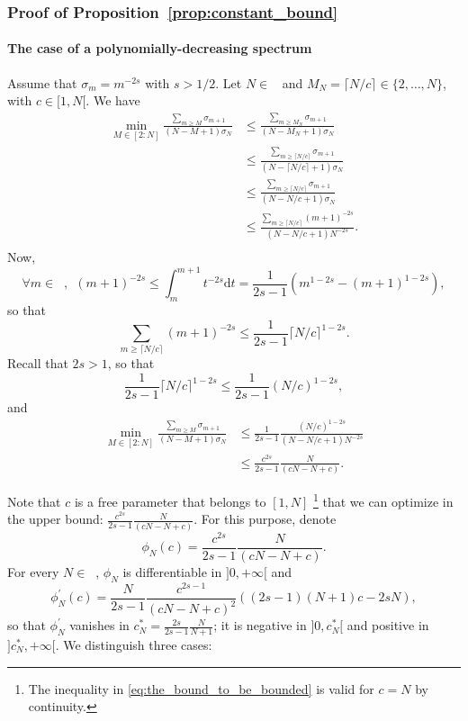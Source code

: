 \documentclass[twoside,11pt]{book}
\numberwithin{theorem}{chapter}
\numberwithin{definition}{chapter}
\numberwithin{proposition}{chapter}
\numberwithin{corollary}{chapter}
\numberwithin{example}{chapter}
\numberwithin{lemma}{chapter}
\DeclareMathOperator{\Ns}{\mathbb{N}^{*}}
\begin{document}
\subsubsection{Proof of Proposition~\ref{prop:constant_bound}}
\paragraph{The case of a polynomially-decreasing spectrum}
Assume that $\sigma_{m} = m^{-2s}$ with $s>1/2$.
Let $N \in \Ns$ and $M_{N} = \lceil{N/c \rceil} \in \{2,\dots,N\}$, with $c \in [1,N[$.
We have
\begin{align}
\min_{M \in [2:N]}\frac{\sum_{m \geq M} \sigma_{m+1}}{(N-M+1)\sigma_N} & \leq \frac{\sum_{m \geq M_N} \sigma_{m+1}}{(N-M_N+1)\sigma_N} \\
& \leq \frac{\sum_{m \geq \lceil{N/c\rceil}} \sigma_{m+1}}{(N-\lceil{N/c\rceil}+1)\sigma_N} \\
& \leq \frac{\sum_{m \geq \lceil{N/c\rceil}} \sigma_{m+1}}{(N-N/c+1)\sigma_N}\\
& \leq \frac{\sum_{m \geq \lceil{N/c\rceil}} (m+1)^{-2s}}{(N-N/c+1)N^{-2s}}.\\
\end{align}
Now,
\begin{equation}
\forall m \in \Ns, \:\: (m+1)^{-2s} \leq \int_{m}^{m+1}t^{-2s} \mathrm{d}t = \frac{1}{2s-1}(m^{1-2s}-(m+1)^{1-2s}),
\end{equation}
so that
\begin{equation}
\sum\limits_{m \geq \lceil{N/c\rceil}} (m+1)^{-2s} \leq \frac{1}{2s-1}\lceil{N/c\rceil}^{1-2s}.
\end{equation}
Recall that $2s>1$, so that
\begin{equation}
\frac{1}{2s-1}\lceil{N/c\rceil}^{1-2s} \leq \frac{1}{2s-1}(N/c)^{1-2s},
\end{equation}
and
\begin{align}
\min_{M \in [2:N]}\frac{\sum_{m \geq M} \sigma_{m+1}}{(N-M+1)\sigma_N}
& \leq \frac{1}{2s-1}\frac{(N/c)^{1-2s}}{(N-N/c+1)N^{-2s}}\\
& \leq \frac{c^{2s}}{2s-1}\frac{N}{(cN-N+c)} \label{eq:the_bound_to_be_bounded}.
\end{align}

Note that $c$ is a free parameter that belongs to $[1,N]$ \footnote{The inequality in \eqref{eq:the_bound_to_be_bounded} is valid for $c = N$ by continuity.} that we can optimize in the upper bound: $\frac{c^{2s}}{2s-1}\frac{N}{(cN-N+c)}$. For this purpose, denote
\begin{equation}
\phi_{N}(c) = \frac{c^{2s}}{2s-1}\frac{N}{(cN-N+c)}.
\end{equation}
For every $N \in \Ns$, $\phi_{N}$ is differentiable in $]0,+\infty[$ and
\begin{equation}
\phi_{N}^{'}(c) = \frac{N}{2s-1}\frac{c^{2s-1}}{(cN-N+c)^{2}} \left( (2s-1)(N+1) c - 2s N \right),
\end{equation}
so that $\phi_{N}^{'}$ vanishes in $c_{N}^{*} = \frac{2s}{2s-1} \frac{N}{N+1}$; it is negative in $]0,c_{N}^{*}[$ and positive in $]c_{N}^{*}, +\infty[$. We distinguish three cases:
\end{document}
